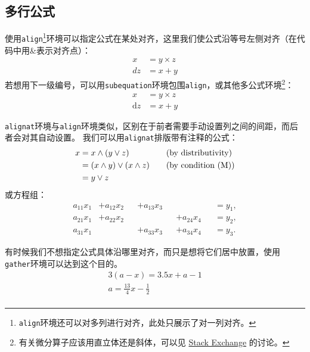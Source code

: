 \documentclass[zihao = -4, linespread = 1.5]{ctexart}
\begin{document}
\subsection{多行公式}\label{subsec:multiEqn}
使用\texttt{align}\footnote{\texttt{align}环境还可以对多列进行对齐，此处只展示了对一列对齐。}环境可以指定公式在某处对齐，这里我们使公式沿等号左侧对齐（在代码中用\&表示对齐点）：
\begin{align}\label{eq:align}
  x &= y \times z  \\
  dz &= x + y
\end{align}
若想用下一级编号，可以用\texttt{subequation}环境包围\texttt{align}，或其他多公式环境\footnote{有关微分算子应该用直立体还是斜体，可以见 \href{https://tex.stackexchange.com/questions/14821/whats-the-proper-way-to-typeset-a-differential-operator}{Stack Exchange} 的讨论。}：
\begin{subequations}\label{eq:subEqn}
  \begin{align}
  x &= y \times z  \\
  \mathrm{d}z &= x + y
\end{align}
\end{subequations}

\texttt{alignat}环境与\texttt{align}环境类似，区别在于前者需要手动设置列之间的间距，而后者会对其自动设置。
我们可以用\texttt{alignat}排版带有注释的公式：
\begin{alignat}{2}
    x &= x \wedge (y \vee z) &
    &\quad\text{(by distributivity)}\\
        &= (x \wedge y) \vee (x \wedge z) & &
            \quad\text{(by condition (M))}\notag\\
        &= y \vee z \notag
\end{alignat}
或方程组：
\begin{subequations}
\begin{alignat}{4}
a_{11}x_1 &+ a_{12}x_2 &&+ a_{13}x_3  &&                   &&= y_1,\\
a_{21}x_1 &+ a_{22}x_2 &&                    &&+ a_{24}x_4 &&= y_2,\\
a_{31}x_1 &                   &&+ a_{33}x_3  &&+ a_{34}x_4 &&= y_3.
\end{alignat}
\end{subequations}


有时候我们不想指定公式具体沿哪里对齐，而只是想将它们居中放置，使用\texttt{gather}环境可以达到这个目的。
\begin{gather}
    3(a-x) = 3.5x + a - 1 \\
    a = \frac{13}{4}x - \frac{1}{2} \\
\end{gather}
\end{document}
